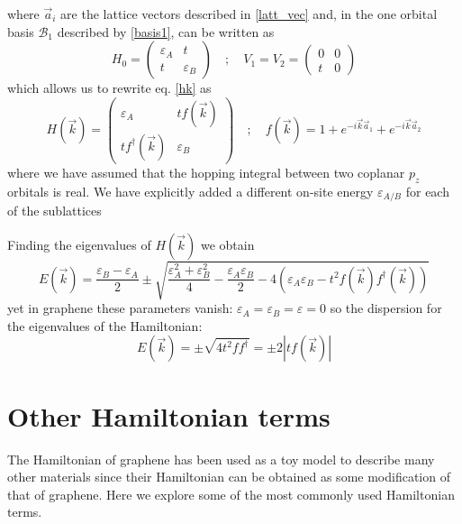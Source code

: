 where $\vec{a}_i$ are the lattice vectors described in \eqref{latt_vec} and, in the one orbital basis $\mathcal{B}_1$ described by \eqref{basis1}, can be written as
\begin{equation}
   H_0 = \left(\begin{array}{cc}
               \varepsilon_A & t \\
               t & \varepsilon_B
         \end{array}\right) \quad;\quad
   V_1 = V_2 = \left(\begin{array}{cc}
                     0 & 0 \\
                     t & 0
               \end{array}\right)
\end{equation}
which allows us to rewrite eq. \eqref{hk} as
\begin{equation}
  H(\vec{k})=\left(\begin{array}{cc}
        \varepsilon_{A} & tf(\vec{k}) \\
  tf^{\dagger}(\vec{k}) & \varepsilon_{B}
  \end{array}\right) \quad;\quad
  f(\vec{k}) = 1 + e^{-i\vec{k}\vec{a}_{1}}+
e^{-i\vec{k}\vec{a}_{2}}
\end{equation}
where we have assumed that the hopping integral between two coplanar $p_z$ orbitals is real. We have explicitly added a different on-site energy $\varepsilon_{A/B}$ for each of the sublattices

Finding the eigenvalues of $H(\vec{k})$ we obtain
\begin{equation}
  E(\vec{k})=\frac{\varepsilon_{B}-\varepsilon_{A}}{2}\pm
  \sqrt{\frac{\varepsilon^{2}_{A}+\varepsilon^{2}_{B}}{4}-
  \frac{\varepsilon_{A}\varepsilon_{B}}{2}-
  4\left(\varepsilon_{A}\varepsilon_{B}-
                                   t^2f(\vec{k})f^{\dagger}(\vec{k})\right) }
\end{equation}
yet in graphene these parameters vanish: $\varepsilon_{A}=\varepsilon_{B}=\varepsilon=0$ so the dispersion for the eigenvalues of the Hamiltonian:
\begin{equation}
  E(\vec{k})=\pm\sqrt{4t^2ff^{\dagger}} = \pm2|tf(\vec{k})|
\end{equation}

%
%
%
%
%

\section{Other Hamiltonian terms}
The Hamiltonian of graphene has been used as a toy model to describe many other materials since their Hamiltonian can be obtained as some modification of that of graphene. Here we explore some of the most commonly used Hamiltonian terms.

